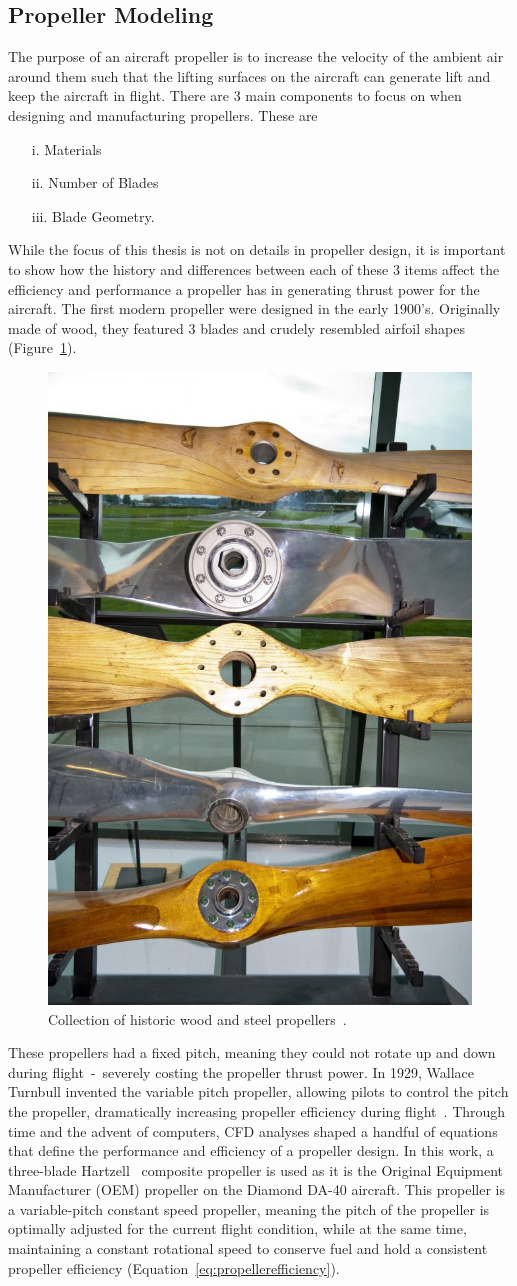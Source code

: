 \subsection{\textbf{Propeller Modeling}}
The purpose of an aircraft propeller is to increase the velocity of the ambient air around them such that the lifting surfaces on the aircraft can generate lift and keep the aircraft in flight. There are 3 main components to focus on when designing and manufacturing propellers. These are
\begin{itemize}
    \item[i.] Materials
    \item[ii.] Number of Blades
    \item[iii.] Blade Geometry.
\end{itemize}
While the focus of this thesis is not on details in propeller design, it is important to show how the history and differences between each of these 3 items affect the efficiency and performance a propeller has in generating thrust power for the aircraft. The first modern propeller were designed in the early 1900's. Originally made of wood, they featured 3 blades and crudely resembled airfoil shapes (Figure~\ref{fig:woodprops}).

\begin{figure}[!ht]\label{fig:woodprops}
    \centering
    \includegraphics[width=0.3\linewidth]{Figures/woodProps.jpg}
    \caption{Collection of historic wood and steel propellers~\cite{ianHowIdentifyHistoric2016}.}
\end{figure}

These propellers had a fixed pitch, meaning they could not rotate up and down during flight~-~severely costing the propeller thrust power. In 1929, Wallace Turnbull invented the variable pitch propeller, allowing pilots to control the pitch the propeller, dramatically increasing propeller efficiency during flight~\cite{ianShortHistoryAircraft2018}. Through time and the advent of computers, CFD analyses shaped a handful of equations that define the performance and efficiency of a propeller design. In this work, a three-blade Hartzell~\cite{HartzellPropellerInc1969} composite propeller is used as it is the Original Equipment Manufacturer (OEM) propeller on the Diamond DA-40 aircraft. This propeller is a variable-pitch constant speed propeller, meaning the pitch of the propeller is optimally adjusted for the current flight condition, while at the same time, maintaining a constant rotational speed to conserve fuel and hold a consistent propeller efficiency (Equation~\ref{eq:propellerefficiency}).

